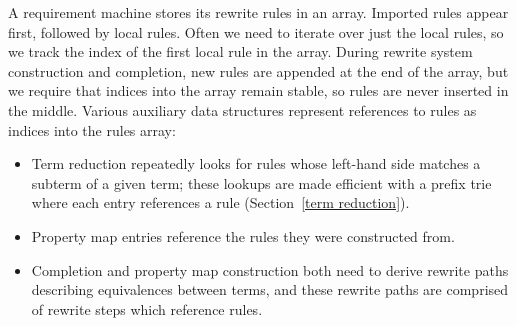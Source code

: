 \documentclass[../generics]{subfiles}
\begin{document}
%
%
A requirement machine stores its rewrite rules in an array. Imported rules appear first, followed by local rules. Often we need to iterate over just the local rules, so we track the index of the first local rule in the array. During rewrite system construction and completion, new rules are appended at the end of the array, but we require that indices into the array remain stable, so rules are never inserted in the middle. Various auxiliary data structures represent references to rules as indices into the rules array:
\begin{itemize}
\item Term reduction repeatedly looks for rules whose left-hand side matches a subterm of a given term; these lookups are made efficient with a prefix trie where each entry references a rule (Section~\ref{term reduction}).
\item Property map entries reference the rules they were constructed from.
\item Completion and property map construction both need to derive rewrite paths describing equivalences between terms, and these rewrite paths are comprised of rewrite steps which reference rules.
\end{itemize}

%
%
\end{document}
